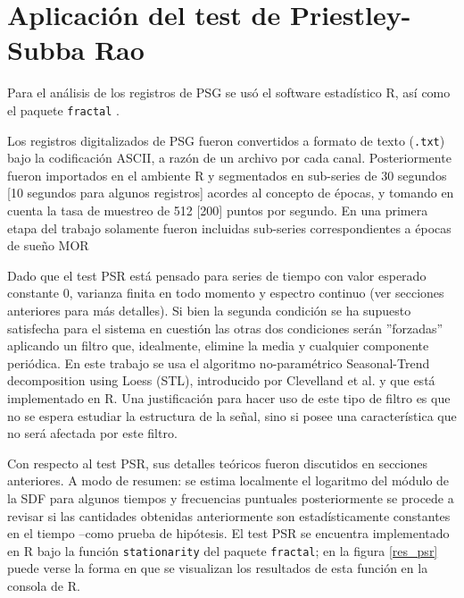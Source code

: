 \section{Aplicaci\'on del test de Priestley-Subba Rao}

Para el an\'alisis de los registros de PSG se us\'o el software estad\'istico R\cite{R_citar}, 
as\'i como el paquete \texttt{fractal} \cite{R_fractal}.

Los registros digitalizados de PSG fueron convertidos a formato de texto (\texttt{.txt}) bajo
la codificaci\'on ASCII, a raz\'on de un archivo por cada canal. Posteriormente fueron importados
en el ambiente R y segmentados en sub-series de 30 segundos [10 segundos para algunos 
registros] acordes al concepto de \'epocas, y tomando en cuenta la tasa de muestreo de 512 [200]
puntos por segundo. 
En una primera etapa del trabajo solamente fueron incluidas sub-series correspondientes a
\'epocas de sue\~no MOR

Dado que
el test PSR est\'a pensado para
series de tiempo con valor esperado constante 0, varianza finita en todo momento y espectro
continuo (ver secciones anteriores para m\'as detalles). Si bien la 
segunda condici\'on se 
ha supuesto satisfecha para el sistema en cuesti\'on
las otras dos condiciones ser\'an ''forzadas'' aplicando  un
filtro que, idealmente, elimine la media y cualquier componente peri\'odica.
En este trabajo se usa el algoritmo no-param\'etrico Seasonal-Trend decomposition using Loess 
(STL), introducido por Clevelland et al. \cite{Cleveland1990} y que est\'a implementado en R.
Una justificaci\'on para hacer uso de este tipo de filtro es 
que no se espera estudiar la estructura de la se\~nal, sino si posee una caracter\'istica
que no ser\'a afectada por este filtro.

Con respecto al test PSR, sus detalles te\'oricos fueron discutidos en secciones anteriores.
A modo
de resumen: se estima localmente el logaritmo del m\'odulo de la SDF
para algunos tiempos y frecuencias puntuales
posteriormente se procede a revisar
si las cantidades obtenidas anteriormente son estad\'isticamente constantes
en el tiempo --como prueba de hip\'otesis.
El test PSR se encuentra implementado en R bajo la funci\'on \texttt{stationarity}
del paquete \texttt{fractal}; en la figura \ref{res_psr} puede verse la forma en que se
visualizan los resultados de esta funci\'on en la consola de R.

